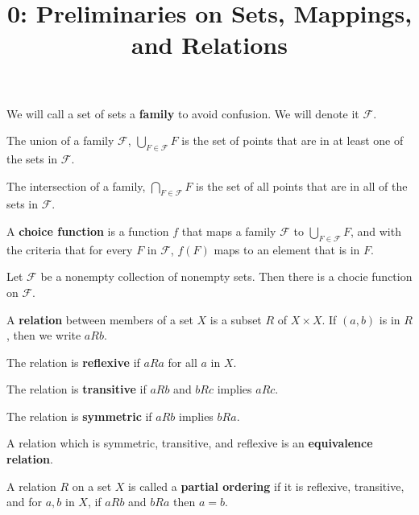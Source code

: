 \documentclass{article}
\title{0: Preliminaries on Sets, Mappings, and Relations}
\begin{document}
\maketitle

\begin{definition}

We will call a set of sets a \textbf{family} to avoid confusion. We will denote it $\mathcal{F}$. 

The union of a family $\mathcal{F}$, $\bigcup_{F\in\mathcal{F}}F$ is the set of points that are in at least one of the sets in $\mathcal{F}$. 

The intersection of a family, $\bigcap_{F\in\mathcal{F}}F$ is the set of all points that are in all of the sets in $\mathcal{F}$. 
\end{definition}

\begin{definition}
A \textbf{choice function} is a function $f$ that maps a family $\mathcal{F}$ to $\bigcup_{F\in\mathcal{F}}F$, and with the criteria that for every $F$ in $\mathcal{F}$, $f(F)$ maps to an element that is in $F$.  
\end{definition}

\begin{definition}
Let $\mathcal{F}$ be a nonempty collection of nonempty sets. Then there is a chocie function on $\mathcal{F}$. 
\end{definition}

\begin{definition}[Relation]
A \textbf{relation} between members of a set $X$ is a subset $R$ of $X\times X$. If $(a,b)$ is in $R$, then we write $aRb$. 

The relation is \textbf{reflexive} if $aRa$ for all $a$ in $X$. 

The relation is \textbf{transitive} if $aRb$ and $bRc$ implies $aRc$. 

The relation is \textbf{symmetric} if $aRb$ implies $bRa$.
\end{definition}

\begin{definition}
A relation which is symmetric, transitive, and reflexive is an \textbf{equivalence relation}.  
\end{definition}

\begin{definition}
A relation $R$ on a set $X$ is called a \textbf{partial ordering} if it is reflexive, transitive, and for $a,b$ in $X$, if $aRb$ and $bRa$ then $a=b$. 
\end{definition}
\end{document}
